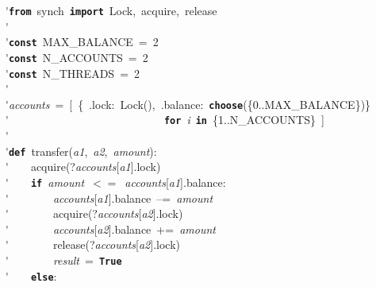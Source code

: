 \'\>\texttt{\textbf{from}}~synch~\texttt{\textbf{import}}~Lock,~acquire,~release\\

\'\>\\

\'\>\texttt{\textbf{const}}~MAX\_BALANCE~=~2\\

\'\>\texttt{\textbf{const}}~N\_ACCOUNTS~=~2\\

\'\>\texttt{\textbf{const}}~N\_THREADS~=~2\\

\'\>\\

\'\>\textit{accounts}~=~[~\{~.lock:~Lock(),~.balance:~\texttt{\textbf{choose}}(\{0..MAX\_BALANCE\})\}\\

\'\>~~~~~~~~~~~~~~~~~~~~~~~~~~~~\texttt{\textbf{for}}~\textit{i}~\texttt{\textbf{in}}~\{1..N\_ACCOUNTS\}~]\\

\'\>\\

\'\>\texttt{\textbf{def}}~transfer(\textit{a1},~\textit{a2},~\textit{amount}):\\

\'\>~~~~acquire(?\textit{accounts}[\textit{a1}].lock)\\

\'\>~~~~\texttt{\textbf{if}}~\textit{amount}~$<=$~\textit{accounts}[\textit{a1}].balance:\\

\'\>~~~~~~~~\textit{accounts}[\textit{a1}].balance~--=~\textit{amount}~\\

\'\>~~~~~~~~acquire(?\textit{accounts}[\textit{a2}].lock)\\

\'\>~~~~~~~~\textit{accounts}[\textit{a2}].balance~+=~\textit{amount}~\\

\'\>~~~~~~~~release(?\textit{accounts}[\textit{a2}].lock)\\

\'\>~~~~~~~~\textit{result}~=~\texttt{\textbf{True}}\\

\'\>~~~~\texttt{\textbf{else}}:\\

